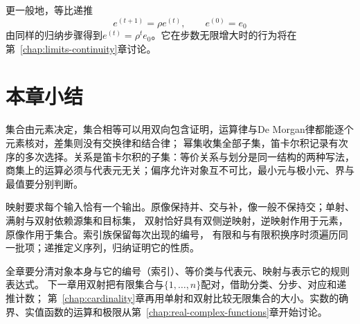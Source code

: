 更一般地，等比递推
\begin{equation}
 e^{(t+1)}=\rho e^{(t)},\qquad e^{(0)}=e_0
 \label{eq:prelim-geometric-recurrence}
\end{equation}
由同样的归纳步骤得到$e^{(t)}=\rho^te_0$。它在步数无限增大时的行为将在第~\ref{chap:limits-continuity}章讨论。

\section{本章小结}
\label{sec:prelim-sets-functions-summary}

集合由元素决定，集合相等可以用双向包含证明，运算律与De Morgan律都能逐个元素核对，差集则没有交换律和结合律；
幂集收集全部子集，笛卡尔积记录有次序的多次选择。关系是笛卡尔积的子集：等价关系与划分是同一结构的两种写法，
商集上的运算必须与代表元无关；偏序允许对象互不可比，最小元与极小元、界与最值要分别判断。

映射要求每个输入恰有一个输出。原像保持并、交与补，像一般不保持交；单射、满射与双射依赖源集和目标集，
双射恰好具有双侧逆映射，逆映射作用于元素，原像作用于集合。索引族保留每次出现的编号，
有限和与有限积换序时须遍历同一批项；递推定义序列，归纳证明它的性质。

全章要分清对象本身与它的编号（索引）、等价类与代表元、映射与表示它的规则表达式。
下一章用双射把有限集合与$\{1,\ldots,n\}$配对，借助分类、分步、对应和递推计数；
第~\ref{chap:cardinality}章再用单射和双射比较无限集合的大小。实数的确界、实值函数的运算和极限从第~\ref{chap:real-complex-functions}章开始讨论。
